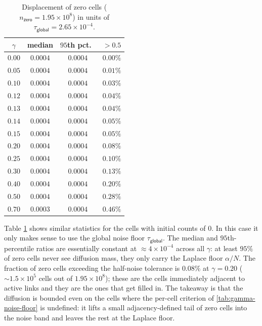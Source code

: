\documentclass[sigconf, review]{acmart}
\newcommand{\NFG}{\tau_{\textsf{global}}}
\begin{document}
\begin{table}[b]
\centering
\caption{Displacement of zero cells
($n_{\textsf{zero}} = 1.95 \times 10^{8}$) in units of
$\NFG = 2.65 \times 10^{-4}$.}
\label{tab:gamma-zero-cells}
\small
\setlength{\tabcolsep}{6pt}
\begin{tabular}{cccc}
\toprule
$\gamma$ & median & $95$th pct.\ & $>\!0.5$ \\
\midrule
$0.00$ & $0.0004$ & $0.0004$ & $0.00\%$ \\
$0.05$ & $0.0004$ & $0.0004$ & $0.01\%$ \\
$0.10$ & $0.0004$ & $0.0004$ & $0.03\%$ \\
$0.12$ & $0.0004$ & $0.0004$ & $0.04\%$ \\
$0.13$ & $0.0004$ & $0.0004$ & $0.04\%$ \\
$0.14$ & $0.0004$ & $0.0004$ & $0.05\%$ \\
$0.15$ & $0.0004$ & $0.0004$ & $0.05\%$ \\
\rowcolor{gray!15} 
$0.20$
       & $0.0004$ & $0.0004$ & $0.08\%$ \\
$0.25$ & $0.0004$ & $0.0004$ & $0.10\%$ \\
$0.30$ & $0.0004$ & $0.0004$ & $0.13\%$ \\
$0.40$ & $0.0004$ & $0.0004$ & $0.20\%$ \\
$0.50$ & $0.0004$ & $0.0004$ & $0.28\%$ \\
$0.70$ & $0.0003$ & $0.0004$ & $0.46\%$ \\
\bottomrule
\end{tabular}
\end{table}


Table \ref{tab:gamma-zero-cells} shows similar statistics for the cells with initial counts of $0$. In this case it only makes sense to use the global noise floor $\NFG$.  
The median
and $95$th-percentile ratios are essentially constant at
$\approx 4 \times 10^{-4}$ across all $\gamma$: at least $95\%$
of zero cells never see diffusion mass, they only carry the
Laplace floor $\alpha / N$. The fraction of zero cells exceeding
the half-noise tolerance is $0.08\%$ at $\gamma = 0.20$
($\sim 1.5 \times 10^{5}$ cells out of $1.95 \times 10^{8}$);
these are the cells immediately adjacent to active links and
they are the ones that get filled in. The takeaway is
that the diffusion is bounded even on the cells where the
per-cell criterion of \cref{tab:gamma-noise-floor} is undefined:
it lifts a small adjacency-defined tail of zero cells into the
noise band and leaves the rest at the Laplace floor.  
\end{document}
